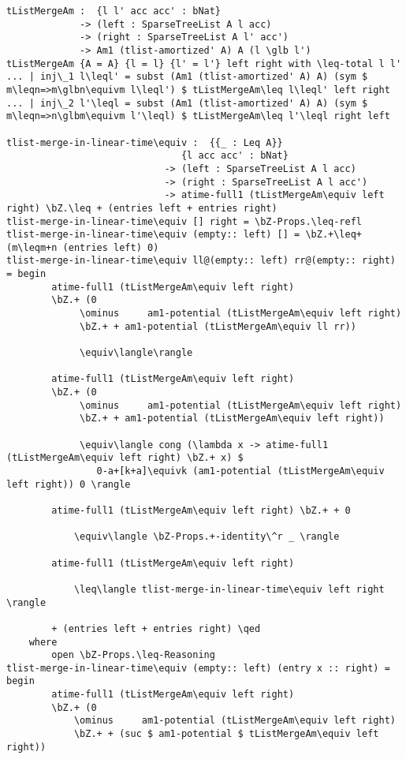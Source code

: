 \begin{lstlisting}[caption={Merging heaps},label={lst:appendix:heap:merge}]
tListMergeAm :  {l l' acc acc' : bNat}
             -> (left : SparseTreeList A l acc)
             -> (right : SparseTreeList A l' acc')
             -> Am1 (tlist-amortized' A) A (l \glb l')
tListMergeAm {A = A} {l = l} {l' = l'} left right with \leq-total l l'
... | inj\_1 l\leql' = subst (Am1 (tlist-amortized' A) A) (sym $ m\leqn=>m\glbn\equivm l\leql') $ tListMergeAm\leq l\leql' left right
... | inj\_2 l'\leql = subst (Am1 (tlist-amortized' A) A) (sym $ m\leqn=>n\glbm\equivm l'\leql) $ tListMergeAm\leq l'\leql right left

tlist-merge-in-linear-time\equiv :  {{_ : Leq A}}
                               {l acc acc' : bNat}
                            -> (left : SparseTreeList A l acc)
                            -> (right : SparseTreeList A l acc')
                            -> atime-full1 (tListMergeAm\equiv left right) \bZ.\leq + (entries left + entries right)
tlist-merge-in-linear-time\equiv [] right = \bZ-Props.\leq-refl
tlist-merge-in-linear-time\equiv (empty:: left) [] = \bZ.+\leq+ (m\leqm+n (entries left) 0)
tlist-merge-in-linear-time\equiv ll@(empty:: left) rr@(empty:: right) = begin
        atime-full1 (tListMergeAm\equiv left right)
        \bZ.+ (0
             \ominus     am1-potential (tListMergeAm\equiv left right)
             \bZ.+ + am1-potential (tListMergeAm\equiv ll rr))

             \equiv\langle\rangle

        atime-full1 (tListMergeAm\equiv left right)
        \bZ.+ (0
             \ominus     am1-potential (tListMergeAm\equiv left right)
             \bZ.+ + am1-potential (tListMergeAm\equiv left right))

             \equiv\langle cong (\lambda x -> atime-full1 (tListMergeAm\equiv left right) \bZ.+ x) $
                0-a+[k+a]\equivk (am1-potential (tListMergeAm\equiv left right)) 0 \rangle

        atime-full1 (tListMergeAm\equiv left right) \bZ.+ + 0

            \equiv\langle \bZ-Props.+-identity\^r _ \rangle

        atime-full1 (tListMergeAm\equiv left right)

            \leq\langle tlist-merge-in-linear-time\equiv left right \rangle

        + (entries left + entries right) \qed
    where
        open \bZ-Props.\leq-Reasoning
tlist-merge-in-linear-time\equiv (empty:: left) (entry x :: right) = begin
        atime-full1 (tListMergeAm\equiv left right)
        \bZ.+ (0
            \ominus     am1-potential (tListMergeAm\equiv left right)
            \bZ.+ + (suc $ am1-potential $ tListMergeAm\equiv left right))


\end{lstlisting}
